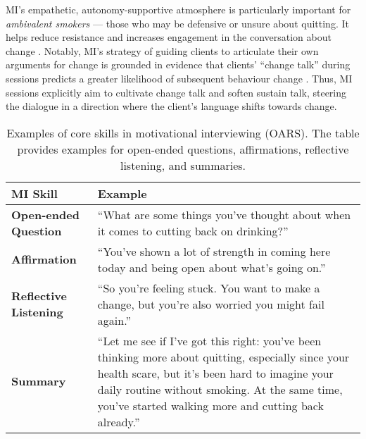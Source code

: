 MI's empathetic, autonomy-supportive atmosphere is particularly important for
\emph{ambivalent smokers} --- those who may be defensive or unsure about quitting. It
helps reduce resistance and increases engagement in the conversation about change
\cite{Miller1983, MillerRollnick2023}. Notably, MI's strategy of guiding clients to
articulate their own arguments for change is grounded in evidence that clients'
``change talk'' during sessions predicts a greater likelihood of subsequent behaviour
change \cite{MillerRose2009}. Thus, MI sessions explicitly aim to cultivate change talk
and soften sustain talk, steering the dialogue in a direction where the client's
language shifts towards change.

\begin{table}[ht!]
	\centering
	\begin{tabular}{@{} p{} p{} @{}}
		\toprule
		\textbf{MI Skill}             & \textbf{Example}                                                                                                                                                                                                               \\
		\midrule
		\textbf{Open-ended Question}  &
		``What are some things you've thought about when it comes to cutting back on drinking?''                                                                                                                                                                       \\
		\addlinespace
		\textbf{Affirmation}          &
		``You've shown a lot of strength in coming here today and being open about what’s going on.''                                                                                                                                                                  \\
		\addlinespace
		\textbf{Reflective Listening} &
		``So you're feeling stuck. You want to make a change, but you're also worried you might fail again.''                                                                                                                                                          \\
		\addlinespace
		\textbf{Summary}              &
		``Let me see if I've got this right: you've been thinking more about quitting, especially since your health scare, but it's been hard to imagine your daily routine without smoking. At the same time, you’ve started walking more and cutting back already.'' \\
		\bottomrule
	\end{tabular}
	\caption[Examples of MI skills]{Examples of core skills in motivational interviewing (OARS). The table provides examples for open-ended questions, affirmations, reflective listening, and summaries.}
	\label{tab:mi_skill_examples}
\end{table}

